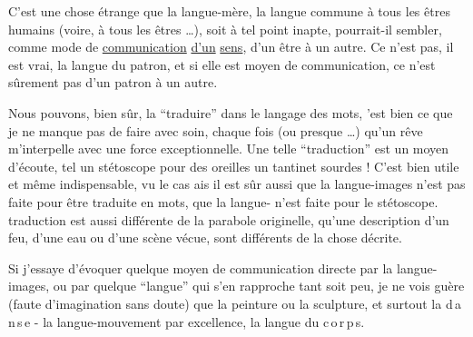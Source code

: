 


C'est une chose étrange que la langue-mère, la langue commune à tous les êtres humains (voire, à tous les êtres \ldots),  soit à tel point inapte, pourrait-il sembler, comme mode de \uline{communication} \uline{d'un} \uline{sens}, d'un être à un autre. Ce n'est pas, il est vrai, la langue du patron, et si elle est moyen de communication, ce n'est sûrement pas d'un patron à un autre.

Nous pouvons, bien sûr, la ``traduire'' dans le langage des mots,  'est bien ce que je ne manque pas de faire avec   soin, chaque fois (ou presque \ldots) qu'un rêve  m'interpelle avec une force exceptionnelle. Une telle ``traduction'' est un moyen d'écoute, tel un stétoscope pour des oreilles un tantinet sourdes !  C'est bien utile et même indispensable, vu le cas ais il est sûr aussi que la langue-images n'est pas  faite pour être traduite en mots,  que la langue- n'est faite pour le stétoscope.  traduction est aussi différente de la parabole originelle, qu'une description d'un feu, d'une eau ou d'une scène vécue, sont différents de la chose décrite.

Si j'essaye d'évoquer quelque moyen de communication directe par la langue-images, ou par quelque  ``langue'' qui s'en rapproche tant soit peu, je ne vois guère (faute d'imagination sans doute) que la peinture ou la sculpture, et surtout la \mbox{d\,a\,n\,s\,e} - la langue-mouvement par excellence, la langue du \mbox{c\,o\,r\,p\,s}.

